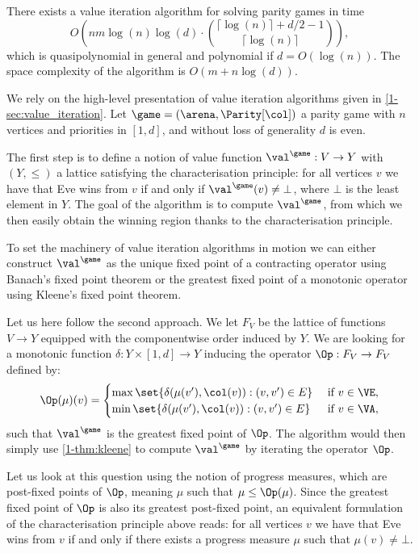 \begin{theorem}
\label{3-thm:value_iteration_quasipoly}
There exists a value iteration algorithm for solving parity games in time 
\[
O\left(nm \log(n) \log(d) \cdot  \binom{\lceil \log(n) \rceil + d/2 - 1}{\lceil \log(n) \rceil} \right),
\]
which is quasipolynomial in general and polynomial if $d = O(\log(n))$.
The space complexity of the algorithm is $O(m + n \log(d))$.
\end{theorem}

We rely on the high-level presentation of value iteration algorithms given in \cref{1-sec:value_iteration}.
Let $\game = (\arena,\Parity[\col])$ a parity game with $n$ vertices and priorities in $[1,d]$,
and without loss of generality $d$ is even.

The first step is to define a notion of value function $\val^\game : V \to Y$ with $(Y,\le)$ a lattice satisfying the characterisation principle:
for all vertices $v$ we have that Eve wins from $v$ if and only if $\val^\game(v) \neq \bot$, where $\bot$ is the least element in $Y$.
The goal of the algorithm is to compute $\val^\game$, from which we then easily obtain the winning region thanks to the characterisation principle.

To set the machinery of value iteration algorithms in motion we can either construct $\val^\game$ as the unique fixed point of a contracting operator using Banach's fixed point theorem or the greatest fixed point of a monotonic operator using Kleene's fixed point theorem.

Let us here follow the second approach. 
We let $F_V$ be the lattice of functions $V \to Y$ equipped with the componentwise order induced by $Y$.
We are looking for a monotonic function $\delta : Y \times [1,d] \to Y$ inducing the operator $\Op : F_V \to F_V$ defined by:
\[
\Op(\mu)(v) = 
\begin{cases}
\max \set{\delta( \mu(v'), \col(v)) : (v,v') \in E} & \text{ if } v \in \VE, \\
\min \set{\delta( \mu(v'), \col(v)) : (v,v') \in E} & \text{ if } v \in \VA,
\end{cases}
\]
such that $\val^\game$ is the greatest fixed point of $\Op$.
The algorithm would then simply use \cref{1-thm:kleene} to compute $\val^\game$ by iterating the operator $\Op$.

Let us look at this question using the notion of progress measures, which are post-fixed points of $\Op$,
meaning $\mu$ such that $\mu \le \Op(\mu)$. 
Since the greatest fixed point of $\Op$ is also its greatest post-fixed point, an equivalent formulation of the characterisation principle above reads: for all vertices $v$ we have that Eve wins from $v$ if and only if there exists a progress measure $\mu$ such that $\mu(v) \neq \bot$.

